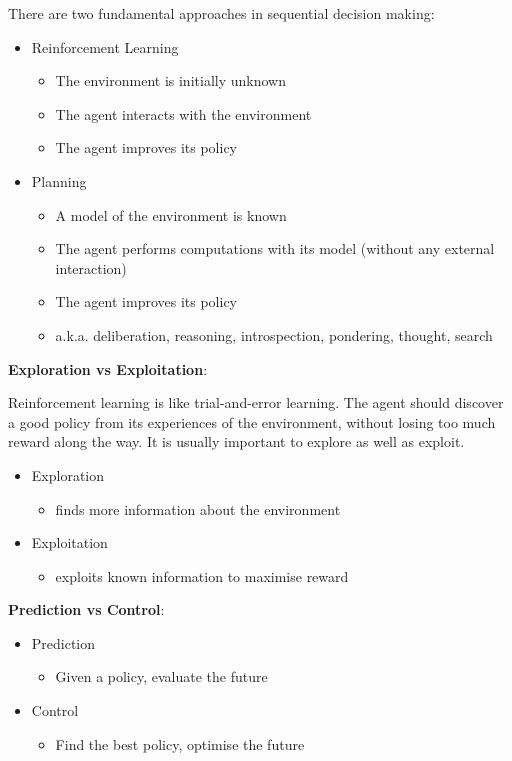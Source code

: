 \documentclass{article}
\begin{document}
There are two fundamental approaches in sequential decision making:

\begin{itemize}
    \item Reinforcement Learning
    \begin{itemize}
        \item The environment is initially unknown
        \item The agent interacts with the environment
        \item The agent improves its policy
    \end{itemize}
    \item Planning
    \begin{itemize}
        \item A model of the environment is known
        \item The agent performs computations with its model (without any external interaction)
        \item The agent improves its policy
        \item a.k.a. deliberation, reasoning, introspection, pondering, thought, search
    \end{itemize}
\end{itemize}

\textbf{Exploration vs Exploitation}:

Reinforcement learning is like trial-and-error learning. The agent should discover a good policy from its experiences of the environment, without losing too much reward along the way. 
It is usually important to explore as well as exploit.

\begin{itemize}
    \item Exploration
    \begin{itemize}
        \item finds more information about the environment
    \end{itemize}
    \item Exploitation
    \begin{itemize}
        \item exploits known information to maximise reward
    \end{itemize}
\end{itemize}

\textbf{Prediction vs Control}:

\begin{itemize}
    \item Prediction
    \begin{itemize}
        \item Given a policy, evaluate the future
    \end{itemize}
    \item Control
    \begin{itemize}
        \item Find the best policy, optimise the future
    \end{itemize}
\end{itemize}
\end{document}
